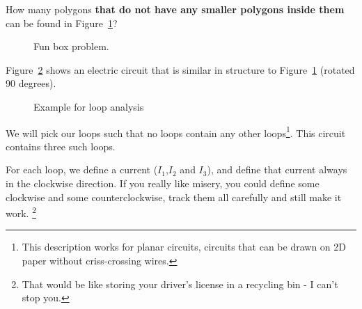 \begin{clevel}
How many polygons \textbf{that do not have any smaller polygons inside them} can be found in Figure~\ref{F:4RECT}?
\end{clevel}

\begin{figure}[H]
\begin{center}
\caption{Fun box problem.}
\label{F:4RECT}
\end{center}
\end{figure}

Figure~\ref{F:4R} shows an electric circuit that is similar in structure to Figure~\ref{F:4RECT} (rotated 90 degrees).

\begin{figure}[H]
\begin{center}
\caption{Example for loop analysis}
\label{F:4R}
\end{center}
\end{figure}

We will pick our loops such that no loops contain any other loops\footnote{This description works for planar circuits, circuits that can be drawn on 2D paper without criss-crossing wires.}. This circuit contains three such loops.\par
For each loop, we define a current ($I_1$,$I_2$ and $I_3$), and define that current always in the clockwise direction. If you really like misery, you could define some clockwise and some counterclockwise, track them all carefully and still make it work. \footnote{That would be like storing your driver's license in a recycling bin - I can't stop you.}

